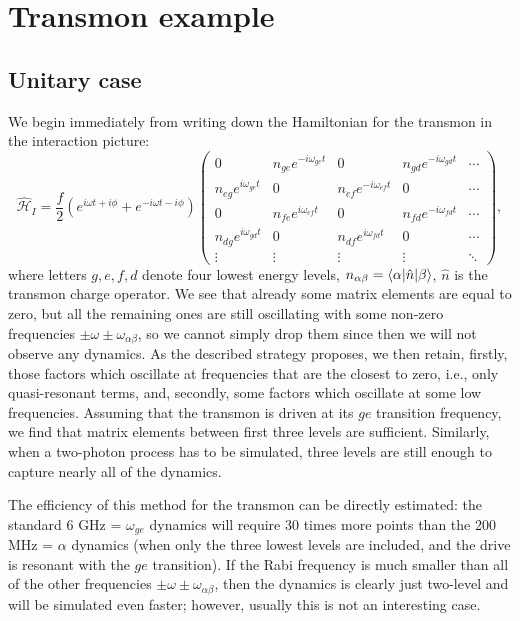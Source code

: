 \section{Transmon example}

\subsection{Unitary case}

We begin immediately from writing down the Hamiltonian for the transmon in the interaction picture:
\begin{equation*}
\hat{\mathcal H}_I =
\frac{f}{2}(e^{i\omega t +i\phi}+e^{-i\omega t - i\phi})
\left(
\begin{matrix}
0          & n_{ge}e^{-i\omega_{ge} t} & 0         & n_{gd}e^{-i\omega_{gd}t} & \cdots\\
             n_{eg}e^{i\omega_{ge}t} & 0          & n_{ef}e^{-i\omega_{ef}t} & 0         & \cdots\\
0          & n_{fe}e^{i\omega_{ef}t}  & 0         & n_{fd}e^{-i\omega_{fd}t} & \cdots\\
n_{dg}e^{i\omega_{gd}t} & 0          & n_{df}e^{i\omega_{fd}t} & 0         & \cdots\\
\vdots&\vdots&\vdots&\vdots& \ddots
\end{matrix}
\right),
\end{equation*}
where letters $g,e,f,d$ denote four lowest energy levels, $n_{\alpha\beta} = \langle\alpha\rvert\hat n \lvert\beta\rangle$, $\hat n$ is the transmon charge operator. 
We see that already some matrix elements are equal to zero, but all the remaining ones are still oscillating with some non-zero frequencies $\pm \omega\pm\omega_{\alpha\beta}$, so we cannot simply drop them since then we will not observe any dynamics. As the described strategy proposes, we then retain, firstly, those factors which oscillate at frequencies that are the closest to zero, i.e., only quasi-resonant terms, and, secondly, some factors which oscillate at some low frequencies. Assuming that the transmon is driven at its $ge$ transition frequency, we find that matrix elements between first three levels are sufficient. Similarly, when a two-photon process has to be simulated, three levels are still enough to capture nearly all of the dynamics.

The efficiency of this method for the transmon can be directly estimated: the standard 6 GHz = $\omega_{ge}$ dynamics will require 30 times more points than the 200 MHz = $\alpha$ dynamics (when only the three lowest levels are included, and the drive is resonant with the $ge$ transition). If the Rabi frequency is much smaller than all of the other frequencies $\pm \omega\pm\omega_{\alpha\beta}$, then the dynamics is clearly just two-level and will be simulated even faster; however, usually this is not an interesting case.

